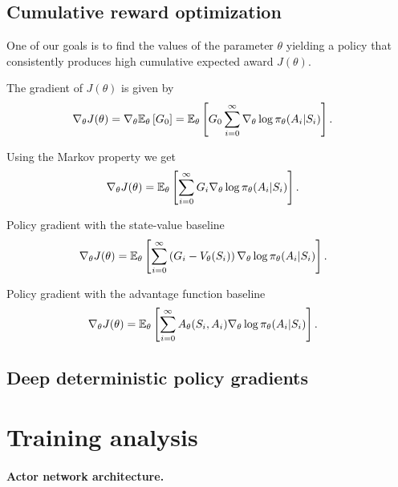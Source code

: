 \documentclass[a4paper,12pt]{amsart}
\newcommand{\stateValueFunc}{V}
\newcommand{\advantageFunc}{A}
\newcommand{\policy}{\pi}
\begin{document}
\subsection{Cumulative reward optimization}
One of our goals is to find the values of the parameter $\theta$ yielding a
policy that consistently produces high cumulative expected award $J(\theta)$.

The gradient of $J(\theta)$ is given by
\begin{align*}
    \nabla_{\theta} J(\theta) &= 
    \nabla_{\theta} \E_{\theta} \left[ G_{0} \right] = 
    \E_{\theta} \left[ G_0 \sum_{i=0}^{\infty} 
    \nabla_{\theta}\log\policy_{\theta}(A_i | S_i) \right].
\end{align*}

Using the Markov property we get
\begin{align*}
    \nabla_{\theta} J(\theta) &= 
    \E_{\theta} \left[ \sum_{i=0}^{\infty} G_{i}
    \nabla_{\theta}\log\policy_{\theta}(A_i | S_i)  \right].
\end{align*}

Policy gradient with the state-value baseline
\begin{align*}
    \nabla_{\theta} J(\theta) &= 
    \E_{\theta} \left[ \sum_{i=0}^{\infty} \left( G_{i}-\stateValueFunc_{\theta}(S_i) \right)
    \nabla_{\theta}\log\policy_{\theta}(A_i | S_i) \right].
\end{align*}

Policy gradient with the advantage function baseline
\begin{align*}
    \nabla_{\theta} J(\theta) &= 
    \E_{\theta} \left[ \sum_{i=0}^{\infty} \advantageFunc_{\theta}(S_i, A_i)
    \nabla_{\theta}\log\policy_{\theta}(A_i | S_i) \right].
\end{align*}

\subsection{Deep deterministic policy gradients}












\section{Training analysis}


\paragraph{Actor network architecture.}
\end{document}
